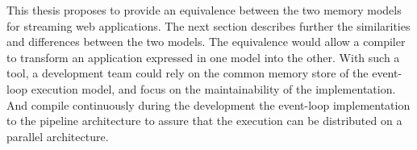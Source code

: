 This thesis proposes to provide an equivalence between the two memory models for streaming web applications.
The next section describes further the similarities and differences between the two models.
The equivalence would allow a compiler to transform an application expressed in one model into the other.
With such a tool, a development team could rely on the common memory store of the event-loop execution model, and focus on the maintainability of the implementation.
And compile continuously during the development the event-loop implementation to the pipeline architecture to assure that the execution can be distributed on a parallel architecture.






\endinput

\subsection{Liquid IT}

The goal of Liquid IT is to hide the technical complexity of scalability to the developer, so he can focus solely on business logic.


